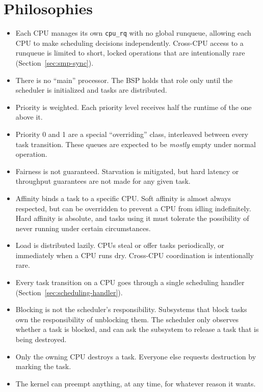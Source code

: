 \documentclass[11pt]{article}
\begin{document}

\section{Philosophies}

\begin{itemize}
	\item Each CPU manages its own \texttt{cpu\_rq} with no global runqueue, allowing each CPU to make scheduling decisions independently. Cross-CPU access to a runqueue is limited to short, locked operations that are intentionally rare (Section~\ref{sec:smp-sync}).
	\item There is no ``main'' processor. The BSP holds that role only until the scheduler is initialized and tasks are distributed.
	\item Priority is weighted. Each priority level receives half the runtime of the one above it.
	\item Priority 0 and 1 are a special ``overriding'' class, interleaved between every task transition. These queues are expected to be \textit{mostly} empty under normal operation.
	\item Fairness is not guaranteed. Starvation is mitigated, but hard latency or throughput guarantees are not made for any given task.
	\item Affinity binds a task to a specific CPU. Soft affinity is almost always respected, but can be overridden to prevent a CPU from idling indefinitely.
	      Hard affinity is absolute, and tasks using it must tolerate the possibility of never running under certain circumstances.
	\item Load is distributed lazily. CPUs steal or offer tasks periodically, or immediately when a CPU runs dry. Cross-CPU coordination is intentionally rare.
	\item Every task transition on a CPU goes through a single scheduling handler (Section~\ref{sec:scheduling-handler}).
	\item Blocking is not the scheduler's responsibility. Subsystems that block tasks own the responsibility of unblocking them. The scheduler only observes whether a task is blocked, and can ask the subsystem to release a task that is being destroyed.
	\item Only the owning CPU destroys a task. Everyone else requests destruction by marking the task.
	\item The kernel can preempt anything, at any time, for whatever reason it wants.
\end{itemize}
\end{document}
